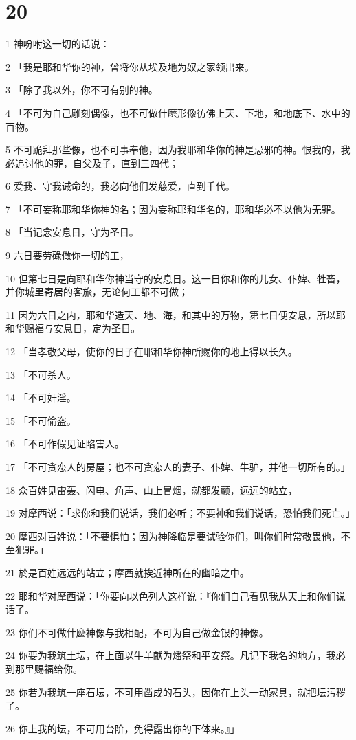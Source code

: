 \chapter{20}

\par 1 神吩咐这一切的话说：
\par 2 「我是耶和华你的神，曾将你从埃及地为奴之家领出来。
\par 3 「除了我以外，你不可有别的神。
\par 4 「不可为自己雕刻偶像，也不可做什麽形像彷佛上天、下地，和地底下、水中的百物。
\par 5 不可跪拜那些像，也不可事奉他，因为我耶和华你的神是忌邪的神。恨我的，我必追讨他的罪，自父及子，直到三四代；
\par 6 爱我、守我诫命的，我必向他们发慈爱，直到千代。
\par 7 「不可妄称耶和华你神的名；因为妄称耶和华名的，耶和华必不以他为无罪。
\par 8 「当记念安息日，守为圣日。
\par 9 六日要劳碌做你一切的工，
\par 10 但第七日是向耶和华你神当守的安息日。这一日你和你的儿女、仆婢、牲畜，并你城里寄居的客旅，无论何工都不可做；
\par 11 因为六日之内，耶和华造天、地、海，和其中的万物，第七日便安息，所以耶和华赐福与安息日，定为圣日。
\par 12 「当孝敬父母，使你的日子在耶和华你神所赐你的地上得以长久。
\par 13 「不可杀人。
\par 14 「不可奸淫。
\par 15 「不可偷盗。
\par 16 「不可作假见证陷害人。
\par 17 「不可贪恋人的房屋；也不可贪恋人的妻子、仆婢、牛驴，并他一切所有的。」
\par 18 众百姓见雷轰、闪电、角声、山上冒烟，就都发颤，远远的站立，
\par 19 对摩西说：「求你和我们说话，我们必听；不要神和我们说话，恐怕我们死亡。」
\par 20 摩西对百姓说：「不要惧怕；因为神降临是要试验你们，叫你们时常敬畏他，不至犯罪。」
\par 21 於是百姓远远的站立；摩西就挨近神所在的幽暗之中。
\par 22 耶和华对摩西说：「你要向以色列人这样说：『你们自己看见我从天上和你们说话了。
\par 23 你们不可做什麽神像与我相配，不可为自己做金银的神像。
\par 24 你要为我筑土坛，在上面以牛羊献为燔祭和平安祭。凡记下我名的地方，我必到那里赐福给你。
\par 25 你若为我筑一座石坛，不可用凿成的石头，因你在上头一动家具，就把坛污秽了。
\par 26 你上我的坛，不可用台阶，免得露出你的下体来。』」

